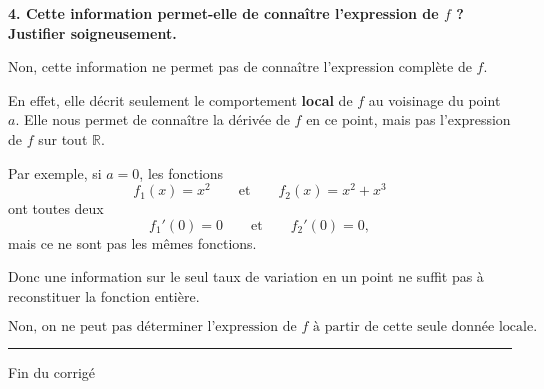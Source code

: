 \documentclass[11pt,a4paper]{article}
\newcommand{\R}{\mathbb{R}}
\begin{document}
\bigskip

\textbf{4. Cette information permet-elle de connaître l'expression de \(f\) ? Justifier soigneusement.}

Non, cette information ne permet pas de connaître l'expression complète de \(f\).

En effet, elle décrit seulement le comportement \textbf{local} de \(f\) au voisinage du point \(a\). Elle nous permet de connaître la dérivée de \(f\) en ce point, mais pas l'expression de \(f\) sur tout \(\R\).

Par exemple, si \(a=0\), les fonctions
\[
f_1(x)=x^2
\qquad \text{et} \qquad
f_2(x)=x^2+x^3
\]
ont toutes deux
\[
f_1'(0)=0
\qquad \text{et} \qquad
f_2'(0)=0,
\]
mais ce ne sont pas les mêmes fonctions.

Donc une information sur le seul taux de variation en un point ne suffit pas à reconstituer la fonction entière.

\[
\boxed{\text{Non, on ne peut pas déterminer l'expression de } f \text{ à partir de cette seule donnée locale.}}
\]

\bigskip
\hrule
\bigskip

                        Fin du corrigé 
\end{document}
